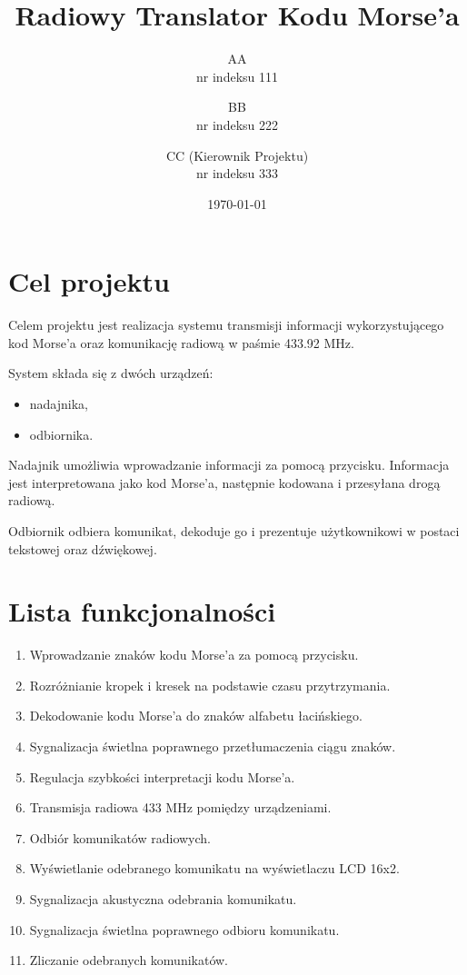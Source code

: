 \documentclass[a4paper,12pt]{article}
\title{Radiowy Translator Kodu Morse'a}
\author{
AA\\nr indeksu 111
\and
BB\\nr indeksu 222
\and
CC (Kierownik Projektu)\\nr indeksu 333
}
\date{\today}
\begin{document}
\maketitle

\tableofcontents
\newpage

\section{Cel projektu}

Celem projektu jest realizacja systemu transmisji informacji wykorzystującego kod Morse'a oraz komunikację radiową w paśmie 433.92 MHz.

System składa się z dwóch urządzeń:

\begin{itemize}
\item nadajnika,
\item odbiornika.
\end{itemize}

Nadajnik umożliwia wprowadzanie informacji za pomocą przycisku. Informacja jest interpretowana jako kod Morse'a, następnie kodowana i przesyłana drogą radiową.

Odbiornik odbiera komunikat, dekoduje go i prezentuje użytkownikowi w postaci tekstowej oraz dźwiękowej.

\section{Lista funkcjonalności}

\begin{enumerate}
\item Wprowadzanie znaków kodu Morse'a za pomocą przycisku.
\item Rozróżnianie kropek i kresek na podstawie czasu przytrzymania.
\item Dekodowanie kodu Morse'a do znaków alfabetu łacińskiego.
\item Sygnalizacja świetlna poprawnego przetłumaczenia ciągu znaków.
\item Regulacja szybkości interpretacji kodu Morse'a.
\item Transmisja radiowa 433 MHz pomiędzy urządzeniami.
\item Odbiór komunikatów radiowych.
\item Wyświetlanie odebranego komunikatu na wyświetlaczu LCD 16x2.
\item Sygnalizacja akustyczna odebrania komunikatu.
\item Sygnalizacja świetlna poprawnego odbioru komunikatu.
\item Zliczanie odebranych komunikatów.
\end{enumerate}
\end{document}
